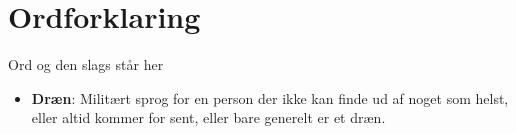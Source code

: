 \chapter{Ordforklaring}\label{ch:ordforklaring}
Ord og den slags står her
\begin{itemize}
	\item \textbf{Dræn}: Militært sprog for en person der ikke kan finde ud af noget som helst, eller altid kommer for sent, eller bare generelt er et dræn.
\end{itemize}